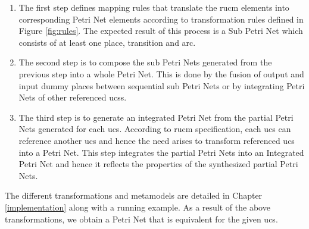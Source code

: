 \begin{enumerate}
\item The first step defines mapping rules that translate the \gls{rucm} elements into corresponding Petri Net elements according to transformation rules defined in Figure \ref{fig:rules}. The expected result of this process is a Sub Petri Net which consists of at least one place, transition and arc.
\item The second step is to compose the sub Petri Nets generated from the previous step into a whole Petri Net. This is done by the fusion of output and input dummy places between sequential sub Petri Nets or by integrating Petri Nets of other referenced \glspl{ucs}.
\item The third step is to generate an integrated Petri Net from the partial Petri Nets generated for each \gls{ucs}. According to \gls{rucm} specification, each \gls{ucs} can reference another \gls{ucs} and hence the need arises to transform referenced \gls{ucs} into a Petri Net. This step integrates the partial Petri Nets into an Integrated Petri Net and hence it reflects the properties of the synthesized partial Petri Nets.
\end{enumerate}



The different transformations and metamodels are detailed in Chapter \ref{implementation} along with a running example. As a result of the above transformations, we obtain a Petri Net that is equivalent for the given \gls{ucs}.

